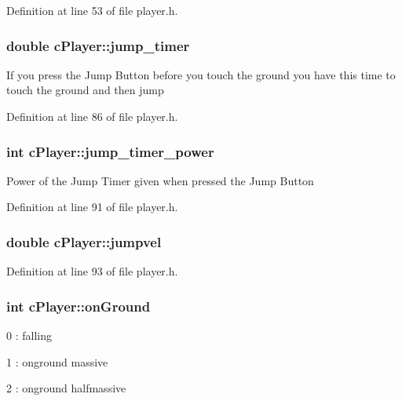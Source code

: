 Definition at line 53 of file player.\-h.

\hypertarget{classc_player_ae58956b3a1628bc541ef8d1b017a8ef4}{
\subsubsection[{jump\-\_\-timer}]{\setlength{\rightskip}{0pt plus 5cm}double c\-Player\-::jump\-\_\-timer}}\label{classc_player_ae58956b3a1628bc541ef8d1b017a8ef4}
If you press the Jump Button before you touch the ground you have this time to touch the ground and then jump 

Definition at line 86 of file player.\-h.

\hypertarget{classc_player_a7dfbe4472d1fd2eeb1949a13981885a7}{
\subsubsection[{jump\-\_\-timer\-\_\-power}]{\setlength{\rightskip}{0pt plus 5cm}int c\-Player\-::jump\-\_\-timer\-\_\-power}}\label{classc_player_a7dfbe4472d1fd2eeb1949a13981885a7}
Power of the Jump Timer given when pressed the Jump Button 

Definition at line 91 of file player.\-h.

\hypertarget{classc_player_a21af56625d269858e77fc61bc042cceb}{
\subsubsection[{jumpvel}]{\setlength{\rightskip}{0pt plus 5cm}double c\-Player\-::jumpvel}}\label{classc_player_a21af56625d269858e77fc61bc042cceb}


Definition at line 93 of file player.\-h.

\hypertarget{classc_player_a03db459aeafd05f9c9b8e90550336b42}{
\subsubsection[{on\-Ground}]{\setlength{\rightskip}{0pt plus 5cm}int c\-Player\-::on\-Ground}}\label{classc_player_a03db459aeafd05f9c9b8e90550336b42}
0 \-: falling\par
 1 \-: onground massive\par
 2 \-: onground halfmassive\par
 

